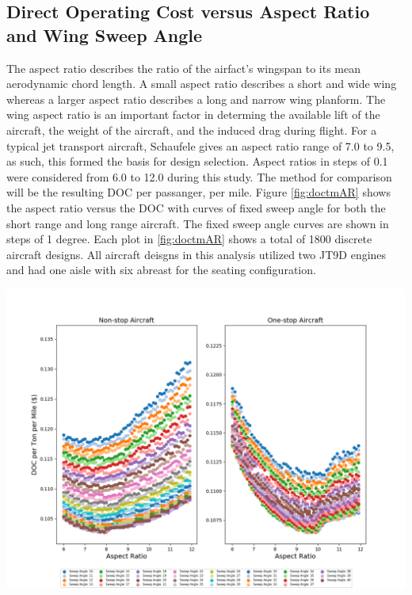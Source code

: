 \documentclass{article}
\begin{document}
    \subsection{Direct Operating Cost versus Aspect Ratio and Wing Sweep Angle}
    \label{sec:AR}
        \begin{flushleft}
            The aspect ratio describes the ratio of the airfact's wingspan to
            its mean aerodynamic chord length. A small aspect ratio describes a
            short and wide wing whereas a larger aspect ratio describes a long
            and narrow wing planform. The wing aspect ratio is an important
            factor in determing the available lift of the aircraft, the weight
            of the aircraft, and the induced drag during flight. For a typical
            jet transport aircraft, Schaufele gives an aspect ratio range of 7.0
            to 9.5, as such, this formed the basis for design selection. Aspect
            ratios in steps of 0.1 were considered from 6.0 to 12.0 during this
            study. The method for comparison will be the resulting DOC per
            passanger, per mile. Figure \ref{fig:doctmAR} shows the aspect ratio
            versus the DOC with curves of fixed sweep angle for both the short
            range and long range aircraft. The fixed sweep angle curves are
            shown in steps of 1 degree. Each plot in \ref{fig:doctmAR} shows a
            total of 1800 discrete aircraft designs. All aircraft deisgns in
            this analysis utilized two JT9D engines and had one aisle with six
            abreast for the seating configuration.
        \end{flushleft}

        \begin{center}
            \includegraphics[scale=0.50]{DOCTM v Sweep Angle.PNG}
            \label{fig:doctmAR}%
        \end{center}
\end{document}
